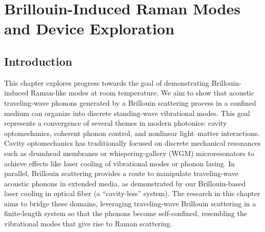 \setcounter{rownumber}{0}
\singlespacing
\chapter{Brillouin-Induced Raman Modes and Device Exploration}
\label{ch:Raman}
\acresetall

\doublespacing


\section{Introduction}
\label{sec:Raman:Introduction}

This chapter explores progress towards the goal of demonstrating Brillouin-induced Raman-like modes at room temperature. We aim to show that acoustic traveling-wave phonons generated by a Brillouin scattering process in a confined medium can organize into discrete standing-wave vibrational modes. This goal represents a convergence of several themes in modern photonics: cavity optomechanics, coherent phonon control, and nonlinear light–matter interactions. Cavity optomechanics has traditionally focused on discrete mechanical resonances such as drumhead membranes or whispering-gallery (\acs{WGM}) microresonators to achieve effects like laser cooling of vibrational modes or phonon lasing. \cite{kippenberg2008cavity, chan2011laser, aspelmeyer2014cavity, vahala2009phonon} In parallel, Brillouin scattering provides a route to manipulate traveling-wave acoustic phonons in extended media, as demonstrated by our Brillouin-based laser cooling in optical fiber (a ``cavity-less'' system). \cite{johnson2023laser, eggleton2013inducing, bahl2012observation, otterstrom2018optomechanical} The research in this chapter aims to bridge these domains, leveraging traveling-wave Brillouin scattering in a finite-length system so that the phonons become self-confined, resembling the vibrational modes that give rise to Raman scattering.

